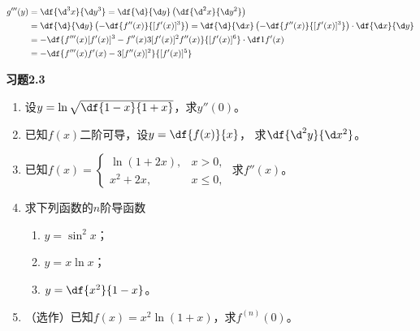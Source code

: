 \begin{align*}
	g'''(y)
	&=\df{\d^3 x}{\d y^3}
	=\df{\d }{\d y}\left(\df{\d^2 x}{\d y^2}\right)\\
	&=\df{\d }{\d y}\left(-\df{f''(x)}{[f'(x)]^3}\right)
	=\df{\d }{\d x}\left(-\df{f''(x)}{[f'(x)]^3}\right)
	\cdot\df{\d x}{\d y}\\
	&=-\df{f'''(x)[f'(x)]^3-f''(x)3[f'(x)]^2f''(x)}{[f'(x)]^6}
	\cdot\df1{f'(x)}\\
	&=-\df{f'''(x)f'(x)-3[f''(x)]^2}{[f'(x)]^5}
\end{align*}
\fin

%
%
%

\bs
\begin{ext}
	{\centering\bf 习题2.3}
	
	\begin{enumerate}
	  \item 设$y=\ln\sqrt{\df{1-x}{1+x}}$，求$y''(0)$。
	  \item 已知$f(x)$二阶可导，设$y=\df{f(x)}{x}$，
	  求$\df{\d^2y}{\d x^2}$。
	  \item 已知$f(x)=\left\{\begin{array}{ll}
	  	\ln(1+2x),& x>0, \\ x^2+2x, & x\leq 0,
	  \end{array}\right.$
	  求$f''(x)$。
	  \item 求下列函数的$n$阶导函数
	  \begin{enumerate}[(1)]
	    \item $y=\sin^2x$；
	    \item $y=x\ln x$；
	    \item $y=\df{x^2}{1-x}$。
	  \end{enumerate}
	  \item （选作）已知$f(x)=x^2\ln(1+x)$，求$f^{(n)}(0)$。
	\end{enumerate}
\end{ext}

